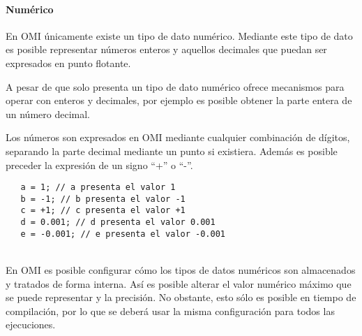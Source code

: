 

\paragraph{Numérico}\label{sec:type_num}
En OMI únicamente existe un tipo de dato numérico. Mediante este tipo de dato es posible representar 
números enteros y aquellos decimales que puedan ser expresados en punto flotante. 

A pesar de que solo presenta un tipo de dato numérico ofrece mecanismos para operar con enteros y decimales, por ejemplo es posible obtener la parte entera de 
un número decimal.

Los números son expresados en OMI mediante cualquier combinación de dígitos, separando la parte decimal mediante un punto si existiera. Además es
posible preceder la expresión de un signo ``+'' o ``-''. \\

\begin{lstlisting}
   a = 1; // a presenta el valor 1
   b = -1; // b presenta el valor -1
   c = +1; // c presenta el valor +1
   d = 0.001; // d presenta el valor 0.001
   e = -0.001; // e presenta el valor -0.001
\end{lstlisting}
\hfill\\

En OMI es posible configurar cómo los tipos de datos numéricos son almacenados y tratados de forma interna. Así es posible alterar el valor numérico máximo que se puede representar 
y la precisión. No obstante, esto sólo es posible en tiempo de compilación, por lo que se deberá usar la misma configuración para todos las ejecuciones. \\


